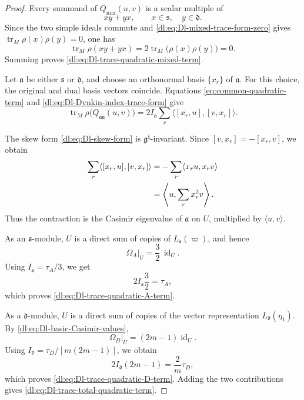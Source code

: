 \documentclass[11pt,reqno]{amsart}
\theoremstyle{definition}
\theoremstyle{remark}
\begin{document}
\begin{proof}
Every summand of \(Q_{\mathrm{mix}}(u,v)\) is a scalar multiple of
\[
  xy+yx,
  \qquad
  x\in\mathfrak s,\quad y\in\mathfrak d.
\]
Since the two simple ideals commute and
\eqref{dl:eq:Dl-mixed-trace-form-zero} gives
\(\operatorname{tr}_M\rho(x)\rho(y)=0\), one has
\begin{equation*}
  \operatorname{tr}_M
  \rho(xy+yx)
  =
  2\operatorname{tr}_M
  \bigl(\rho(x)\rho(y)\bigr)
  =0.
\end{equation*}
Summing proves \eqref{dl:eq:Dl-trace-quadratic-mixed-term}.

Let \(\mathfrak a\) be either
\(\mathfrak s\) or \(\mathfrak d\), and choose an orthonormal basis
\(\{x_r\}\) of \(\mathfrak a\).  For this choice, the original and
dual basis vectors coincide.  Equations
\eqref{eq:common-quadratic-term} and
\eqref{dl:eq:Dl-Dynkin-index-trace-form} give
\begin{equation*}
  \operatorname{tr}_M
  \rho\bigl(Q_{\mathfrak a\mathfrak a}(u,v)\bigr)
  =
  2I_{\mathfrak a}
  \sum_r
  \langle[x_r,u],[v,x_r]\rangle.
\end{equation*}

The skew form \eqref{dl:eq:Dl-skew-form} is
\(\mathfrak g^\natural\)-invariant.  Since
\([v,x_r]=-[x_r,v]\), we obtain
\begin{align*}
  \sum_r
  \langle[x_r,u],[v,x_r]\rangle
  &=
  -\sum_r
  \langle x_ru,x_rv\rangle
  \notag\\
  &=
  \left\langle
    u,
    \sum_r x_r^2v
  \right\rangle.
\end{align*}
Thus the contraction is the Casimir eigenvalue of
\(\mathfrak a\) on \(U\), multiplied by
\(\langle u,v\rangle\).

As an \(\mathfrak s\)-module, \(U\) is a direct sum of copies of
\(L_{\mathfrak s}(\varpi)\), and hence
\begin{equation*}
  \Omega_A|_U
  =
  \frac32\,\operatorname{id}_U.
\end{equation*}
Using
\(I_{\mathfrak s}=\tau_A/3\), we get
\begin{equation*}
  2I_{\mathfrak s}\frac32=\tau_A,
\end{equation*}
which proves \eqref{dl:eq:Dl-trace-quadratic-A-term}.

As a \(\mathfrak d\)-module, \(U\) is a direct sum of copies of the
vector representation
\(L_{\mathfrak d}(\eta_1)\).  By
\eqref{dl:eq:Dl-basic-Casimir-values},
\begin{equation*}
  \Omega_D|_U
  =
  (2m-1)\operatorname{id}_U.
\end{equation*}
Using
\(I_{\mathfrak d}=\tau_D/[m(2m-1)]\), we obtain
\begin{equation*}
  2I_{\mathfrak d}(2m-1)
  =
  \frac2m\tau_D,
\end{equation*}
which proves \eqref{dl:eq:Dl-trace-quadratic-D-term}.
Adding the two contributions gives
\eqref{dl:eq:Dl-trace-total-quadratic-term}.
\end{proof}
\end{document}
